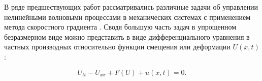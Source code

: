 
В ряде предшествующих работ \cite{porant16, porant17, PorubovAntonov2018mechSystem} рассматривались различные задачи об управлении нелинейными волновыми процессами в механических системах с применением метода скоростного градиента \cite{fradkov_rus_speed_grad}. Сводя большую часть задач в упрощенном безразмерном виде можно представить в виде дифференциального уравнения в частных производных относительно функции смещения или деформации $U(x,t)$:

\begin{equation}
	U_{tt}-U_{xx}+F\left(U\right)+u(x,t)=0.
	\label{sing}
\end{equation}

